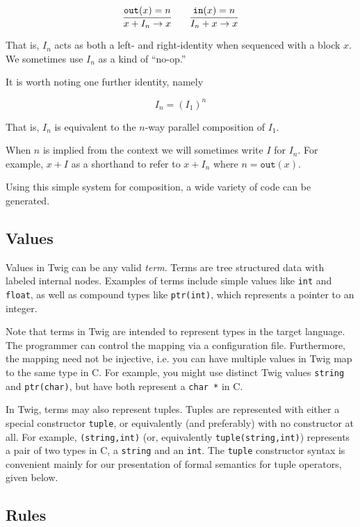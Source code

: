 \[
\infer{x + I_n \to x}{\mathtt{out}(x) = n} 
\qquad
\infer{I_n + x \to x}{\mathtt{in}(x) = n}
\]

That is, $I_n$ acts as both a left- and right-identity when sequenced with a
block $x$. We sometimes use $I_n$ as a kind of ``no-op.''

It is worth noting one further identity, namely

\[
I_n = (I_1)^n
\]

That is, $I_n$ is equivalent to the $n$-way parallel composition of $I_1$.

When $n$ is implied from the context we will sometimes write $I$ for $I_n$.
For example, $x+I$ as a shorthand to refer to $x+I_n$ where $n =
\mathtt{out}(x)$.

Using this simple system for composition, a wide variety of code can be
generated.


\subsection{Values}

Values in Twig can be any valid \emph{term}. Terms are tree structured data
with labeled internal nodes. Examples of terms include simple values like
\texttt{int} and \texttt{float}, as well as compound types like
\texttt{ptr(int)}, which represents a pointer to an integer.

Note that terms in Twig are intended to represent types in the target
language. The programmer can control the mapping via a configuration file.
Furthermore, the mapping need not be injective, i.e. you can have multiple
values in Twig map to the same type in C. For example, you might use distinct
Twig values \texttt{string} and \texttt{ptr(char)}, but have both represent a
\texttt{char *} in C.

In Twig, terms may also represent tuples. Tuples are represented with either a
special constructor \texttt{tuple}, or equivalently (and preferably) with no
constructor at all. For example, \texttt{(string,int)} (or, equivalently
\texttt{tuple(string,int)}) represents a pair of two types in C, a
\texttt{string} and an \texttt{int}. The \texttt{tuple} constructor syntax is
convenient mainly for our presentation of formal semantics for tuple
operators, given below.

\subsection{Rules}


